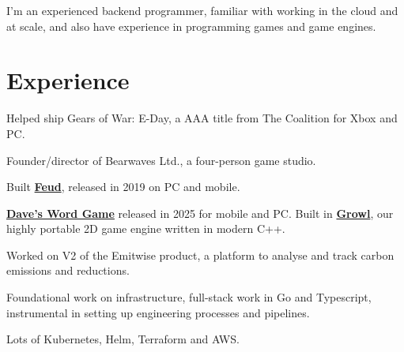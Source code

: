 \documentclass[]{deedy-resume-openfont}
\begin{document}
\hfill
\begin{minipage}[t]{0.63\textwidth} 


\sectionsep
I'm an experienced backend programmer, familiar with working in the cloud and at scale, and also have experience in programming games and game engines.
\sectionsep

\section{Experience}

\begin{tightemize}
\item Helped ship Gears of War: E-Day, a AAA title from The Coalition for Xbox and PC.
\end{tightemize}
\sectionsep

\begin{tightemize}
\item Founder/director of Bearwaves Ltd., a four-person game studio.
\item Built \href{https://store.steampowered.com/app/863400/Feud}{\bf{Feud}}, released in 2019 on PC and mobile.
\item \href{https://www.playdwg.com}{\bf{Dave's Word Game}} released in 2025 for mobile and PC. Built in  \href{https://github.com/Bearwaves/growl}{\bf{Growl}}, our highly portable 2D game engine written in modern C++.
\end{tightemize}
\sectionsep

\begin{tightemize}
\item Worked on V2 of the Emitwise product, a platform to analyse and track carbon emissions and reductions.
\item Foundational work on infrastructure, full-stack work in Go and Typescript, instrumental in setting up engineering processes and pipelines.
\item Lots of Kubernetes, Helm, Terraform and AWS.
\end{tightemize}
\sectionsep


\end{minipage}
\end{document}
